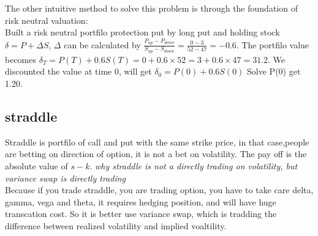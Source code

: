 \documentclass[a4paper,11pt]{article}
\begin{document}
The other intuitive method to solve this problem is through the foundation of risk neutral valuation:\\
Built a risk neutral portfilo protection put by long put and holding stock $\delta=P+\Delta S$, $\Delta$ can be calculated by $\frac{P_{up}-P_{down}}{S_{up}-S_{down}}=\frac{0-3}{52-47}=-0.6$. The portfilo value becomes
$\delta_T=P(T)+0.6S(T)=0+0.6\times 52=3+0.6\times 47=31.2$. We discounted the value at time 0, will get $\delta_0=P(0)+0.6S(0)$ Solve P(0) get 1.20.\\
\subsection{straddle}
Straddle is portfilo of call and put with the same strike price, in that case,people are betting on direction of option, it is not a bet on volatility. The pay off is the absolute value of $s-k$.
{\em why straddle is not a directly trading on volatility, but variance swap is directly trading}\\
Because if you trade straddle, you are trading option, you have to take care delta, gamma, vega and theta, it requires hedging position, and will have huge transcation cost. So it is better use variance swap, which is tradding the difference between realized volatility and implied voaltility.\\
\end{document}

